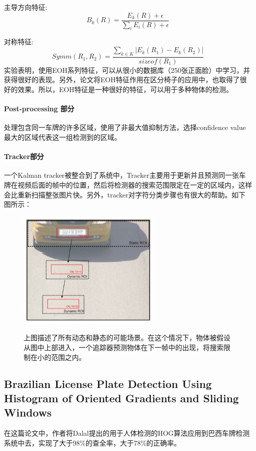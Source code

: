 \begin{enumerate}
主导方向特征:
$$B_k(R)=\frac{E_k(R)+\epsilon}{\sum_iE_i(R)+\epsilon}$$

对称特征: 
$$Symm(R_1,R_2)=\frac{\sum_{k \in K}|E_k(R_1)-E_k(R_2)|}{sizeof(R_1)}$$
实验表明，使用EOH系列特征，可以从很小的数据库（250张正面脸）中学习，并获得很好的表现。另外，论文将EOH特征作用在区分椅子的应用中，也取得了很好的效果。所以，EOH特征是一种很好的特征，可以用于多种物体的检测。
\paragraph{Post-processing 部分}
处理包含同一车牌的许多区域，使用了非最大值抑制方法，选择confidence value最大的区域代表这一组检测到的区域。
\paragraph{Tracker部分}
一个Kalman tracker被整合到了系统中，Tracker主要用于更新并且预测同一张车牌在视频后面的帧中的位置，然后将检测器的搜索范围限定在一定的区域内，这样会比重新扫描整张图片快。另外，tracker对字符分类步骤也有很大的帮助。如下图所示：
\begin{figure}[H]
    \centering 
    \includegraphics[width=0.618\textwidth]{image/2_1_4_6.jpg}    
    \label{logic}
    \caption{上图描述了所有动态和静态的可能场景。在这个情况下，物体被假设从图中上部进入，一个追踪器预测物体在下一帧中的出现，将搜索限制在小的范围之内。}
\end{figure}
\end{enumerate}

\subsection{Brazilian License Plate Detection Using Histogram of Oriented Gradients and Sliding Windows }
在这篇论文\cite{brzl_licence_detect_histogram}中，作者将Dalal提出的用于人体检测的HOG算法应用到巴西车牌检测系统中去，实现了大于98\%的查全率，大于78\%的正确率。

